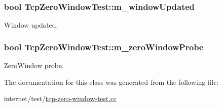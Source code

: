 \subsubsection[{\texorpdfstring{m\+\_\+window\+Updated}{m_windowUpdated}}]{\setlength{\rightskip}{0pt plus 5cm}bool Tcp\+Zero\+Window\+Test\+::m\+\_\+window\+Updated\hspace{0.3cm}{\ttfamily [protected]}}\hypertarget{classTcpZeroWindowTest_a29625fe07d920a3cb28a30e7f73ba500}{}\label{classTcpZeroWindowTest_a29625fe07d920a3cb28a30e7f73ba500}


Window updated. 

\subsubsection[{\texorpdfstring{m\+\_\+zero\+Window\+Probe}{m_zeroWindowProbe}}]{\setlength{\rightskip}{0pt plus 5cm}bool Tcp\+Zero\+Window\+Test\+::m\+\_\+zero\+Window\+Probe\hspace{0.3cm}{\ttfamily [protected]}}\hypertarget{classTcpZeroWindowTest_aa34edd5e5e001d0ac86a213dfd4ab1ab}{}\label{classTcpZeroWindowTest_aa34edd5e5e001d0ac86a213dfd4ab1ab}


Zero\+Window probe. 



The documentation for this class was generated from the following file\+:\begin{DoxyCompactItemize}
\item 
internet/test/\hyperlink{tcp-zero-window-test_8cc}{tcp-\/zero-\/window-\/test.\+cc}\end{DoxyCompactItemize}
